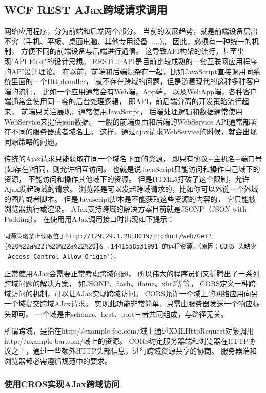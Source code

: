 \documentclass{book}
\begin{document}
\subsection{WCF REST AJax跨域请求调用}

网络应用程序，分为前端和后端两个部分。
当前的发展趋势，就是前端设备层出不穷（手机、平板、桌面电脑、其他专用设备......）。
因此，必须有一种统一的机制，
方便不同的前端设备与后端进行通信。
这导致API构架的流行，甚至出现"API First"的设计思想。
RESTful API是目前比较成熟的一套互联网应用程序的API设计理论\cite{RESTful API设计指南}。
在以前，前端和后端混杂在一起，比如JavaScript直接调用同系统里面的一个Httphandler，
就不存在跨域的问题，但是随着现代的这种多种客户端的流行，
比如一个应用通常会有Web端，App端，
以及WebApp端，各种客户端通常会使用同一套的后台处理逻辑，
即API，前后端分离的开发策略流行起来，
前端只关注展现，通常使用JavaScript，
后端处理逻辑和数据通常使用WebService来提供json数据。
一般的前端页面和后端的WebService API通常部署在不同的服务器或者域名上。
这样，通过ajax请求WebService的时候，就会出现同源策略的问题。

传统的Ajax请求只能获取在同一个域名下面的资源，
即只有协议+主机名+端口号 (如存在)相同，则允许相互访问。
也就是说JavaScript只能访问和操作自己域下的资源，
不能访问和操作其他域下的资源。
但是HTML5打破了这个限制，允许Ajax发起跨域的请求。
浏览器是可以发起跨域请求的，比如你可以外链一个外域的图片或者脚本。
但是Javascript脚本是不能获取这些资源的内容的，
它只能被浏览器执行或渲染。
AJax支持跨域的解决方案目前就是JSONP（JSON with Padding）。
在使用用AJax调用接口时出现如下提示：

\begin{lstlisting}
同源策略禁止读取位于http://129.29.1.28:8019/Product/web/Get?{%20%22a%22:%20%22a%22%20}&_=1441558531991 的远程资源。（原因：CORS 头缺少 'Access-Control-Allow-Origin'）。
\end{lstlisting}

正常使用AJax会需要正常考虑跨域问题，
所以伟大的程序员们又折腾出了一系列跨域问题的解决方案，
如JSONP、flash、ifame、xhr2等等。
CORS定义一种跨域访问的机制，可以让AJax实现跨域访问。
CORS允许一个域上的网络应用向另一个域提交跨域AJax请求。
实现此功能非常简单，只需由服务器发送一个响应标头即可。
一个域是由schema、host、port三者共同组成，与路径无关。

所谓跨域，是指在http://example-foo.com/域上通过XMLHttpRequest对象调用http://example-bar.com/域上的资源。
CORS约定服务器端和浏览器在HTTP协议之上，通过一些额外HTTP头部信息，进行跨域资源共享的协商。
服务器端和浏览器都必需遵循规范中的要求。

\subsubsection{使用CROS实现AJax跨域访问}
\end{document}
